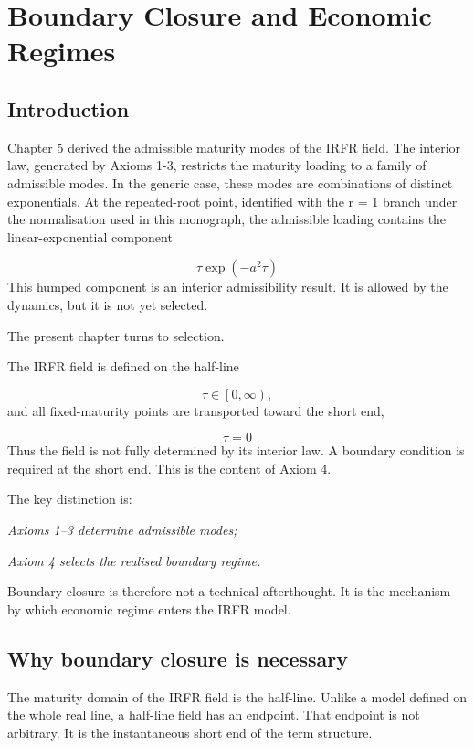 \documentclass[11pt,oneside]{book}
\begin{document}
\chapter{Boundary Closure and Economic Regimes}\label{chapter-6}

\section{Introduction}\label{introduction-3}

Chapter 5 derived the admissible maturity modes of the IRFR field. The
interior law, generated by Axioms 1-3, restricts the maturity loading to
a family of admissible modes. In the generic case, these modes are
combinations of distinct exponentials. At the repeated-root point,
identified with the r = 1 branch under the normalisation used in this
monograph, the admissible loading contains the linear-exponential
component

\[
\tau \exp(-a^2\tau)
\]
This humped component is an interior admissibility result. It is allowed
by the dynamics, but it is not yet selected.

The present chapter turns to selection.

The IRFR field is defined on the half-line

\[
\tau \in \left[0,\infty\right),
\]
and all fixed-maturity points are transported toward the short end,

\[
\tau = 0
\]
Thus the field is not fully determined by its interior law. A boundary
condition is required at the short end. This is the content of Axiom 4.

The key distinction is:

\begin{center}\emph{Axioms 1--3 determine admissible modes;}\end{center}
\begin{center}\emph{Axiom 4 selects the realised boundary regime.}\end{center}
Boundary closure is therefore not a technical afterthought. It is the
mechanism by which economic regime enters the IRFR model.

\section{Why boundary closure is necessary}\label{why-boundary-closure-is-necessary}

The maturity domain of the IRFR field is the half-line. Unlike a model
defined on the whole real line, a half-line field has an endpoint. That
endpoint is not arbitrary. It is the instantaneous short end of the term
structure.
\end{document}
